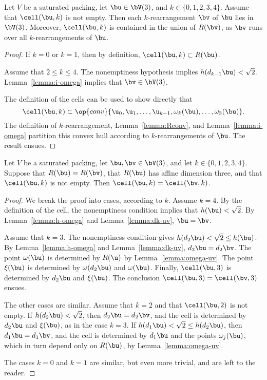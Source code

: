 \begin{lemma}[]\label{lemma:cell-in-rogers} %
  Let $V$ be a saturated packing, let $\bu\in \bV(3)$, and $k\in
  \{0,1,2,3,4\}$.  Assume that $\cell(\bu,k)$ is not empty.
  Then  each $k$-rearrangement $\bv$ of $\bu$ lies in $\bV(3)$.
  Moreover,
  $\cell(\bu,k)$ is contained in the union of
  $R(\bv)$, as $\bv$ runs over all $k$-rearrangements of $\bu$.
\end{lemma}

\begin{proof}  If $k=0$ or $k=1$, 
then by definition, $\cell(\bu,k)\subset R(\bu)$.

Assume that  $2\le k\le 4$.  The nonemptiness hypothesis
implies $h(d_{k-1}\bu)<\sqrt2$.  Lemma~\ref{lemma:i-omega} implies
that $\bv\in \bV(3)$.

The definition of the cells can be used to show directly that
\[
\cell(\bu,k)\subset 
\op{conv}\{\u_0,\u_1,\ldots,\u_{k-1},\omega_{k}(\bu),\ldots,
\omega_3(\bu)\}.
\]
The definition of $k$-rearrangement, Lemma~\ref{lemma:Rconv}, and
Lemma~\ref{lemma:i-omega} partition this convex hull according to
$k$-rearrangements of $\bu$.  The result ensues.
\end{proof}

\begin{lemma}[]\label{lemma:cell-disjoint} %
Let $V$ be a saturated packing, let $\bu,\bv\in \bV(3)$, and let
$k\in \{0,1,2,3,4\}$.  Suppose that $R(\bu)=R(\bv)$, that $R(\bu)$
has affine dimension three,  and that
$\cell(\bu,k)$ is not empty.   Then
$\cell(\bu,k)=\cell(\bv,k)$.
\end{lemma}

\begin{proof} 
We break the proof into cases, according to $k$.
Assume $k=4$.  By the definition of the cell, the nonemptiness condition
implies that $h(\bu)<\sqrt2$.  By Lemma~\ref{lemma:h-omega} and Lemma~\ref{lemma:dk-uv},  $\bu=\bv$.

Assume that $k=3$.  The nonemptiness condition gives
$h(d_2\bu)<\sqrt2\le h(\bu)$.  By Lemma~\ref{lemma:h-omega} and
Lemma~\ref{lemma:dk-uv}, $d_2\bu=d_2\bv$.  The point $\omega(\bu)$ is
determined by $R(\u)$ by Lemma~\ref{lemma:omega-uv}.  The point
$\xi(\bu)$ is determined by $\omega(d_2\bu)$ and $\omega(\bu)$.
Finally, $\cell(\bu,3)$ is determined by $d_2\bu$ and $\xi(\bu)$.  The
conclusion $\cell(\bu,3)=\cell(\bv,3)$ ensues.

The other cases are similar.  Assume that $k=2$ and that
$\cell(\bu,2)$ is not empty.  If $h(d_2\bu)<\sqrt2$, then
$d_2\bu=d_2\bv$, and the cell is determined by $d_2\bu$ and
$\xi(\bu)$, as in the case $k=3$.  If $h(d_1\bu)<\sqrt2\le h(d_2\bu)$,
then $d_1\bu=d_1\bv$, and the cell is determined by $d_1\bu$ and the
points $\omega_j(\bu)$, which in turn depend only on $R(\bu)$, by
Lemma~\ref{lemma:omega-uv}.

The cases $k=0$ and $k=1$ are similar, but even more trivial, and are
left to the reader.
\end{proof}

